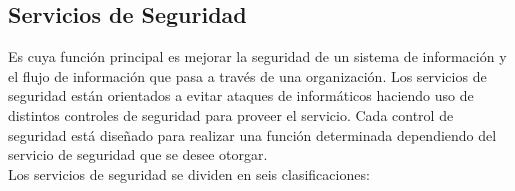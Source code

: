 \subsection{Servicios de Seguridad}

Es cuya función principal es mejorar la seguridad de un sistema de información y el flujo de información que pasa a través de una organización. Los servicios  de seguridad están orientados a evitar ataques de informáticos haciendo uso de distintos controles de seguridad para proveer el servicio. Cada control de seguridad está diseñado para realizar una función determinada dependiendo del servicio de seguridad que se desee otorgar.\\

Los servicios de seguridad se dividen en seis clasificaciones: \\

